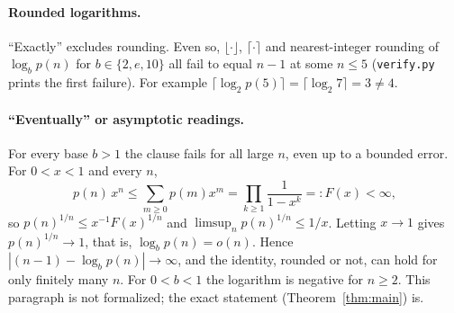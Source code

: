 \documentclass[11pt]{article}
\theoremstyle{definition}
\theoremstyle{remark}
\begin{document}
\paragraph{Rounded logarithms.} ``Exactly'' excludes rounding. Even so,
$\lfloor\cdot\rfloor$, $\lceil\cdot\rceil$ and nearest-integer rounding of
$\log_b p(n)$ for $b\in\{2,e,10\}$ all fail to equal $n-1$ at some $n\le5$
(\texttt{verify.py} prints the first failure). For example
$\lceil\log_2 p(5)\rceil=\lceil\log_2 7\rceil=3\ne4$.

\paragraph{``Eventually'' or asymptotic readings.} For every base $b>1$ the clause
fails for all large $n$, even up to a bounded error. For $0<x<1$ and every $n$,
\[
p(n)\,x^n\le\sum_{m\ge0}p(m)x^m=\prod_{k\ge1}\frac1{1-x^k}=:F(x)<\infty ,
\]
so $p(n)^{1/n}\le x^{-1}F(x)^{1/n}$ and $\limsup_n p(n)^{1/n}\le 1/x$. Letting
$x\to1$ gives $p(n)^{1/n}\to1$, that is, $\log_b p(n)=o(n)$. Hence
$|(n-1)-\log_b p(n)|\to\infty$, and the identity, rounded or not, can hold for
only finitely many $n$. For $0<b<1$ the logarithm is negative for $n\ge2$. This
paragraph is not formalized; the exact statement (Theorem~\ref{thm:main}) is.
\end{document}
